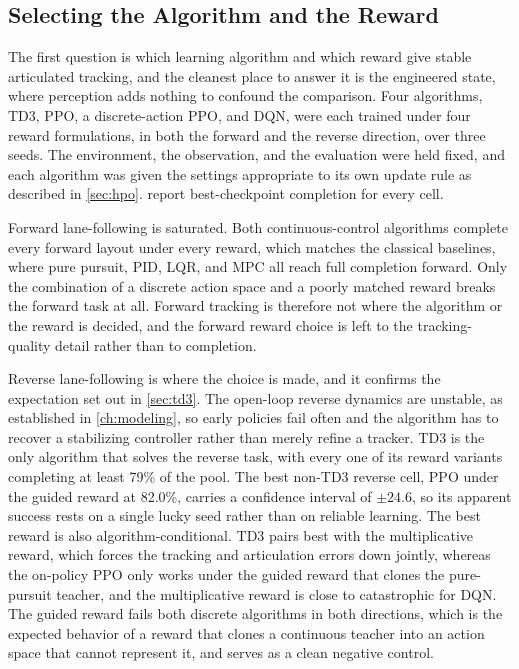 

\subsection{Selecting the Algorithm and the Reward}
\label{sec:algo_reward}

The first question is which learning algorithm and which reward give stable articulated tracking, and the cleanest place to answer it is the engineered state, where perception adds nothing to confound the comparison. Four algorithms, TD3, PPO, a discrete-action PPO, and DQN, were each trained under four reward formulations, in both the forward and the reverse direction, over three seeds. The environment, the observation, and the evaluation were held fixed, and each algorithm was given the settings appropriate to its own update rule as described in \cref{sec:hpo}.  report best-checkpoint completion for every cell.




Forward lane-following is saturated. Both continuous-control algorithms complete every forward layout under every reward, which matches the classical baselines, where pure pursuit, PID, LQR, and MPC all reach full completion forward. Only the combination of a discrete action space and a poorly matched reward breaks the forward task at all. Forward tracking is therefore not where the algorithm or the reward is decided, and the forward reward choice is left to the tracking-quality detail rather than to completion.

Reverse lane-following is where the choice is made, and it confirms the expectation set out in \cref{sec:td3}. The open-loop reverse dynamics are unstable, as established in \cref{ch:modeling}, so early policies fail often and the algorithm has to recover a stabilizing controller rather than merely refine a tracker. TD3 is the only algorithm that solves the reverse task, with every one of its reward variants completing at least 79\% of the pool. The best non-TD3 reverse cell, PPO under the guided reward at 82.0\%, carries a confidence interval of $\pm 24.6$, so its apparent success rests on a single lucky seed rather than on reliable learning. The best reward is also algorithm-conditional. TD3 pairs best with the multiplicative reward, which forces the tracking and articulation errors down jointly, whereas the on-policy PPO only works under the guided reward that clones the pure-pursuit teacher, and the multiplicative reward is close to catastrophic for DQN. The guided reward fails both discrete algorithms in both directions, which is the expected behavior of a reward that clones a continuous teacher into an action space that cannot represent it, and serves as a clean negative control.

